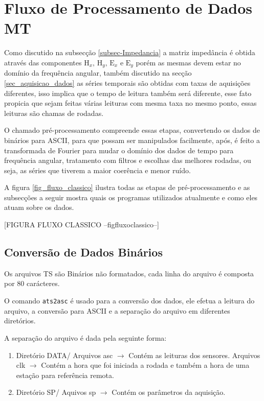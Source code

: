     
    \section{Fluxo de Processamento de Dados MT}
       
        Como discutido na subsecção \ref{subsec-Impedancia} a matriz impedância é obtida através das componentes $\textrm{H}_x,\, \textrm{H}_y,  \, \textrm{E}_x \, \, \textrm{e} \, \, \textrm{E}_y$ porém as mesmas devem estar no domínio da frequência angular, também discutido na secção \ref{sec_aquisicao_dados} as séries temporais são obtidas com taxas de aquisições diferentes, isso implica que o tempo de leitura também será diferente, esse fato propicia que sejam feitas várias leituras com mesma taxa no mesmo ponto, essas leituras são chamas de rodadas. 
        
        O chamado pré-processamento compreende essas etapas, convertendo os dados de binários para ASCII, para que possam ser manipulados facilmente, após, é feito a transformada de Fourier  para mudar o domínio dos dados de tempo para frequência angular, tratamento com filtros e escolhas das melhores rodadas, ou seja, as séries que tiverem a maior coerência e menor ruído.
        
        A figura \ref{fig_fluxo_classico} ilustra todas as etapas de pré-processamento e as subsecções a seguir mostra quais os programas utilizados atualmente e como eles atuam sobre os dados.  
    
    \begin{center} [FIGURA FLUXO CLASSICO --figfluxoclassico--]\end{center}
    
    \subsection{Conversão de Dados Binários}
    \label{subsec-conver-dados}
    Os arquivos TS são Binários não formatados, cada linha do arquivo é composta por 80 carácteres. 
    
    O comando \verb|ats2asc| é usado para a conversão dos dados, ele efetua a leitura do arquivo, a conversão para ASCII e a separação do arquivo em diferentes diretórios.
    
    A separação do arquivo é dada pela seguinte forma:
    
    \begin{enumerate}
     \item Diretório DATA/ 
     \subitem Arquivos asc $\rightarrow$ Contém as leituras dos sensores.
     \subitem Arquivos clk $\rightarrow$ Contém a hora que foi iniciada a rodada e também a hora de uma estação para referência remota.
     \item Diretório SP/
     \subitem Aquivos sp $\rightarrow$ Contém os parâmetros da aquisição.
    \end{enumerate}

